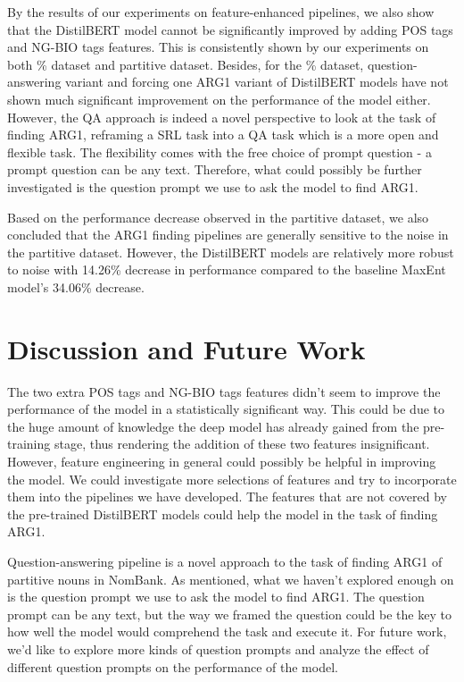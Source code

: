 \documentclass[11pt]{article}
\begin{document}
By the results of our experiments on feature-enhanced pipelines, we also show that the DistilBERT model cannot be significantly improved by adding POS tags and NG-BIO tags features. This is consistently shown by our experiments on both \% dataset and partitive dataset. Besides, for the \% dataset, question-answering variant and forcing one ARG1 variant of DistilBERT models have not shown much significant improvement on the performance of the model either. However, the QA approach is indeed a novel perspective to look at the task of finding ARG1, reframing a SRL task into a QA task which is a more open and flexible task. The flexibility comes with the free choice of prompt question - a prompt question can be any text. Therefore, what could possibly be further investigated is the question prompt we use to ask the model to find ARG1.

Based on the performance decrease observed in the partitive dataset, we also concluded that the ARG1 finding pipelines are generally sensitive to the noise in the partitive dataset. However, the DistilBERT models are relatively more robust to noise with 14.26\% decrease in performance compared to the baseline MaxEnt model's 34.06\% decrease.

\section{Discussion and Future Work}

The two extra POS tags and NG-BIO tags features didn't seem to improve the performance of the model in a statistically significant way. This could be due to the huge amount of knowledge the deep model has already gained from the pre-training stage, thus rendering the addition of these two features insignificant. However, feature engineering in general could possibly be helpful in improving the model. We could investigate more selections of features and try to incorporate them into the pipelines we have developed. The features that are not covered by the pre-trained DistilBERT models could help the model in the task of finding ARG1.

Question-answering pipeline is a novel approach to the task of finding ARG1 of partitive nouns in NomBank. As mentioned, what we haven't explored enough on is the question prompt we use to ask the model to find ARG1. The question prompt can be any text, but the way we framed the question could be the key to how well the model would comprehend the task and execute it. For future work, we'd like to explore more kinds of question prompts and analyze the effect of different question prompts on the performance of the model.
\end{document}

